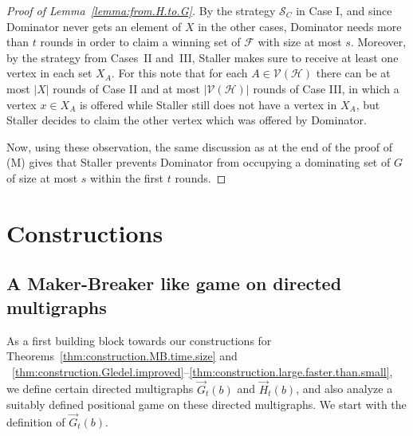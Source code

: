 \documentclass[reqno, 12pt]{amsart}
\numberwithin{equation}{section}
\numberwithin{figure}{section}
\newcommand{\calH}{\mathcal{H}}
\newcommand{\calV}{\mathcal{V}}
\begin{document}
\begin{proof}[Proof of Lemma~\ref{lemma:from.H.to.G}]
By the strategy $\mathcal{S}_C$ in Case I,
and since Dominator never gets an element of $X$ in the other cases,
Dominator needs more than $t$ rounds in order to claim
a winning set of $\mathcal{F}$ with size at most $s$.
Moreover, by the strategy from Cases~II and~III,
Staller makes sure to receive at least one vertex in each set $X_A$.
For this note that for each $A\in \calV(\calH)$ there can be at 
most $|X|$ rounds of Case II and at
most $|\calV(\calH)|$ rounds of Case III, in which a vertex $x\in X_A$ is offered while Staller still does not have a vertex in $X_A$, but Staller decides to claim the other vertex which was offered by Dominator.

Now, using these observation, the same discussion as at the end of the proof of (M) gives that
Staller prevents Dominator from occupying a dominating set of $G$ of size at most $s$ within the first $t$ rounds.
\end{proof}







\section{Constructions}\label{sec:constructions}

\subsection{A Maker-Breaker like game on directed multigraphs}

As a first building block towards our constructions for Theorems~\ref{thm:construction.MB.time.size} and ~\ref{thm:construction.Gledel.improved}--\ref{thm:construction.large.faster.than.small}, we define certain directed multigraphs $\vec{G}_t(b)$ and
$\vec{H}_t(b)$, and also analyze a suitably defined positional game on these directed multigraphs. We start with the definition of $\vec{G}_t(b)$.
\end{document}
